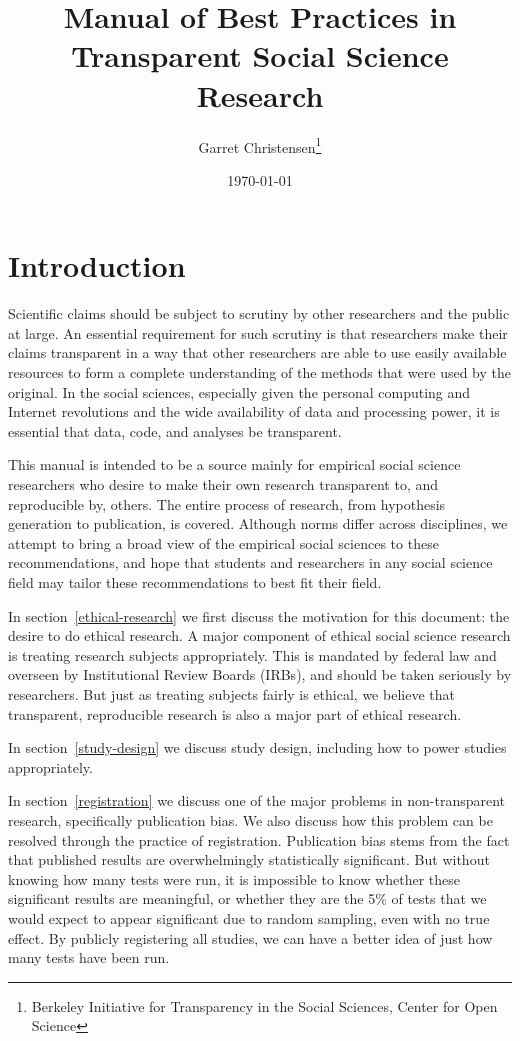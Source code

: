 \documentclass[12pt] {article}
\begin{document}
\title{Manual of Best Practices in Transparent Social Science Research}

\author{Garret Christensen\thanks{Berkeley Initiative for Transparency in the Social Sciences, Center for Open Science}}
\date{\today}
\maketitle
\newpage
\tableofcontents

\newpage
\section{Introduction}\label{introduction}

Scientific claims should be subject to scrutiny by other researchers and
the public at large. An essential requirement for such scrutiny is that
researchers make their claims transparent in a way that other
researchers are able to use easily available resources to form a
complete understanding of the methods that were used by the original. In
the social sciences, especially given the personal computing and
Internet revolutions and the wide availability of data and processing
power, it is essential that data, code, and analyses be transparent.

This manual is intended to be a source mainly for empirical social
science researchers who desire to make their own research transparent
to, and reproducible by, others. The entire process of research, from
hypothesis generation to publication, is covered. Although norms differ
across disciplines, we attempt to bring a broad view of the empirical
social sciences to these recommendations, and hope that students and
researchers in any social science field may tailor these recommendations
to best fit their field.

In section~\ref{ethical-research} we first discuss the motivation for this document: the
desire to do ethical research. A major component of ethical social
science research is treating research subjects appropriately. This is
mandated by federal law and overseen by Institutional Review Boards
(IRBs), and should be taken seriously by researchers. But just as
treating subjects fairly is ethical, we believe that transparent,
reproducible research is also a major part of ethical research.

In section~\ref{study-design} we discuss study design, including how to power studies
appropriately.

In section~\ref{registration} we discuss one of the major problems in non-transparent
research, specifically publication bias. We also discuss how this
problem can be resolved through the practice of registration.
Publication bias stems from the fact that published results are
overwhelmingly statistically significant. But without knowing how many
tests were run, it is impossible to know whether these significant
results are meaningful, or whether they are the 5\% of tests that we
would expect to appear significant due to random sampling, even with no
true effect. By publicly registering all studies, we can have a better
idea of just how many tests have been run.
\end{document}
